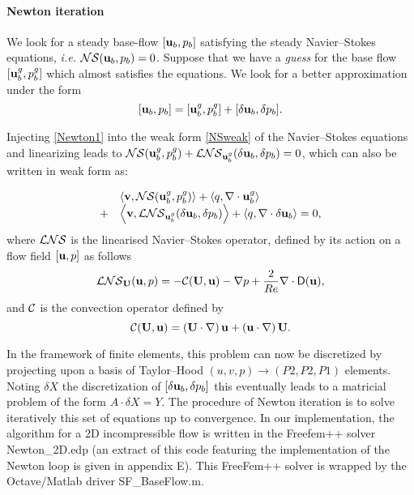 \documentclass[twocolumn,10pt]{asme2ej}
\newcommand{\be}[1]{ \begin{equation} \label{#1}}
\newcommand{\ee}{\end{equation}}
\newcommand{\bes}[1]{ \begin{equation} \label{#1}\begin{array}{rl}}
\newcommand{\ees}{\end{array}\end{equation}}
\begin{document}
\paragraph{Newton iteration}


We look for a steady base-flow $[{\bf u}_b,p_b]$ satisfying the steady Navier--Stokes equations, \textit{i.e.} 
${\cal NS} ({\bf u}_b,p_b) = 0$.
Suppose that we have a {\em guess}  for the base flow $[{\bf u}_b^g,p_b^g]$  which almost satisfies the equations. 
We look for a better approximation under the form
\be{Newton1}
[{\bf u}_b,p_b]  = [{\bf u}_b^g,p_b^g] + [\delta {\bf u}_b, \delta p_b].
\ee

Injecting \eqref{Newton1} into the weak form \eqref{NSweak} of the Navier--Stokes equations and linearizing leads to  
${\cal NS}  ({\bf u}_b^g,p_b^g) +  {\cal LNS} _{{\bf u}_b^g}(\delta {\bf u}_b,\delta p_b) = 0$, which can also be written in weak form as:

\bes{Newton2}
&\left< {\bf v}, {\cal NS} ({\bf u}_b^g,p_b^g)\right> + \left<q, \nabla \cdot {\bf u}_b^g\right>  
\\
+ &\left< { \bf v}, {\cal LNS} _{{\bf u}_b^g}( \delta {\bf u}_b,\delta p_b) \right> + \left<q, \nabla \cdot \delta{\bf u}_b\right> = 0,
\ees
where ${\cal LNS}$ is the linearised Navier--Stokes operator, defined by its action on a flow field $[{\bf u} , p]$ as follows 
\be{defNSL}
 {\cal LNS}_{{\bf U}}( {\bf u}, p) = - {\cal C}( {\bf U} , {\bf u}) -\nabla p
+\frac{2}{Re} \nabla  \cdot {\mathsf{D}}({\bf u}), %
 \ee
and ${\cal C}$ is the convection operator defined by 
\be{defC}
{\cal C}( {\bf U} , {\bf u}) = \left( {\bf U} \cdot \nabla \right) {\bf u} + \left( {\bf u} \cdot \nabla \right)  {\bf U}.
\ee

In the framework of finite elements, this problem can now be discretized by projecting upon a basis of Taylor--Hood $(u,v,p) \rightarrow (P2,P2,P1)$ elements. Noting $\delta X$ the discretization of $[\delta {\bf u}_b,\delta p_b]$ this eventually leads to a matricial problem of the form $A \cdot \delta X = Y$. The procedure of Newton iteration is to solve iteratively this set of equations up to convergence.
In our implementation, the algorithm for a 2D incompressible flow is written in the Freefem++ solver {\sf Newton\_2D.edp} (an extract of this code featuring the implementation of the Newton loop is given in appendix E). This FreeFem++ solver is wrapped by the Octave/Matlab driver {\sf SF\_BaseFlow.m}.
\end{document}
